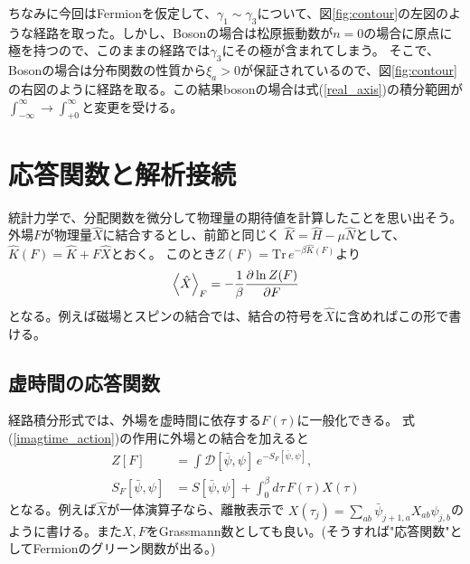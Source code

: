 \documentclass[a4paper,12pt]{jsarticle}
\begin{document}
ちなみに今回はFermionを仮定して、$\gamma_1\sim\gamma_3$について、図\ref{fig:contour}の左図のような経路を取った。しかし、Bosonの場合は松原振動数が$n=0$の場合に原点に極を持つので、このままの経路では$\gamma_3$にその極が含まれてしまう。
そこで、Bosonの場合は分布関数の性質から$\xi_a > 0$が保証されているので、図\ref{fig:contour}の右図のように経路を取る。この結果bosonの場合は式(\ref{real_axis})の積分範囲が$\int_{-\infty}^{\infty}\rightarrow \int_{+0}^{\infty}$と変更を受ける。


\section{応答関数と解析接続}
統計力学で、分配関数を微分して物理量の期待値を計算したことを思い出そう。
外場$F$が物理量$\hat X$に結合するとし、前節と同じく
$\hat K=\hat H-\mu\hat N$として、$\hat K(F)=\hat K+F\hat X$とおく。
このとき$Z(F)=\mathrm{Tr}\,e^{-\beta\hat K(F)}$より
\begin{equation}
  \ev{\hat X}_F=-\frac{1}{\beta}\frac{\partial\ln Z(F)}{\partial F}
\end{equation}
となる。例えば磁場とスピンの結合では、結合の符号を$\hat X$に含めればこの形で書ける。

\subsection{虚時間の応答関数}
経路積分形式では、外場を虚時間に依存する$F(\tau)$に一般化できる。
式(\ref{imagtime_action})の作用に外場との結合を加えると
\begin{align}
  Z[F]&=\int\mathcal D[\bar\psi,\psi]\,e^{-S_F[\bar\psi,\psi]},\\
  S_F[\bar\psi,\psi]&=S[\bar\psi,\psi]+\int_0^\beta d\tau\,F(\tau)X(\tau)
\end{align}
となる。例えば$\hat X$が一体演算子なら、離散表示で
$X(\tau_j)=\sum_{ab}\bar\psi_{j+1,a}X_{ab}\psi_{j,b}$のように書ける。また$X, F$をGrassmann数としても良い。(そうすれば"応答関数"としてFermionのグリーン関数が出る。)
\end{document}
